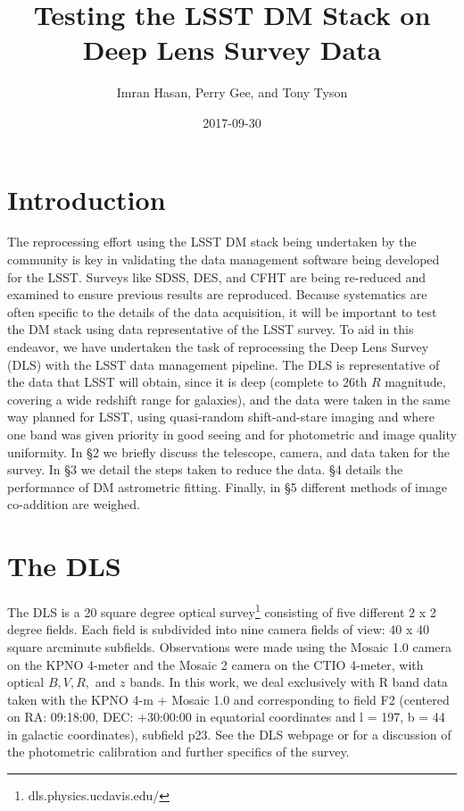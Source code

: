 \documentclass[DM,toc]{lsstdoc}
\title{Testing the LSST DM Stack on Deep Lens Survey Data}
\author{Imran Hasan, Perry Gee, and Tony Tyson}
\date{2017-09-30}
\begin{document}
\maketitle

\section{Introduction}
The reprocessing effort using the LSST DM stack being undertaken by the community is key in validating the data management software being developed for the LSST. Surveys like SDSS, DES, and CFHT are being re-reduced and examined to ensure previous results are reproduced.  Because systematics are often specific to the details of the data acquisition, it will be important to test the DM stack using data representative of the LSST survey.  To aid in this endeavor, we have undertaken the task of reprocessing the Deep Lens Survey (DLS) with the LSST data management pipeline. The DLS is representative of the data that LSST will obtain, since it is deep
(complete to 26th $R$ magnitude, covering a wide redshift range for galaxies), and the data were taken in the same way planned for LSST, using quasi-random shift-and-stare imaging and where one band was given priority in good seeing and for photometric and image quality uniformity.  In \S 2 we briefly discuss the telescope, camera, and data taken for the survey. In \S 3 we detail the steps taken to reduce the data. \S 4 details the performance of DM astrometric fitting. Finally, in \S 5 different methods of image co-addition are weighed.

\section{The DLS}
The DLS is a 20 square degree optical survey\footnote{dls.physics.ucdavis.edu/} consisting of five different 2 x 2 degree fields. Each field is subdivided into nine camera fields of view: 40 x 40 square arcminute subfields. Observations were made using the Mosaic 1.0 camera on the KPNO 4-meter and the Mosaic 2 camera on the CTIO 4-meter, with optical $B, V, R,$ and $z$ bands. In this work, we deal exclusively with R band data taken with the KPNO 4-m + Mosaic 1.0 and corresponding to field F2 (centered on RA: 09:18:00, DEC: +30:00:00 in equatorial coordinates and l = 197, b = 44 in galactic coordinates), subfield p23. See the DLS webpage or \cite{2012MNRAS.421.2251W} for a discussion of the photometric calibration and further specifics of the survey.
\end{document}

